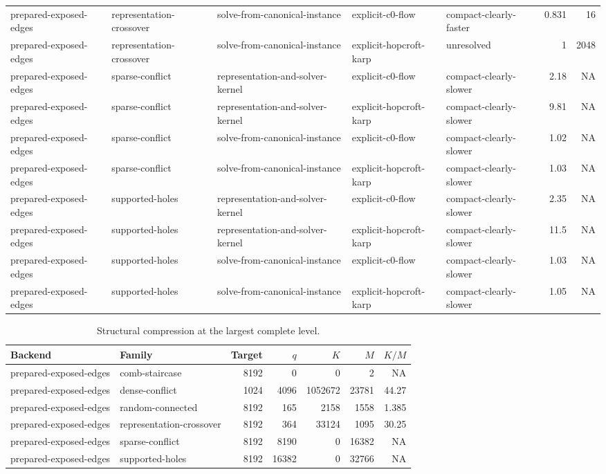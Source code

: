 \begin{table}[t]
\begin{tabular}{lllllrr}
prepared-exposed-edges & representation-crossover & solve-from-canonical-instance & explicit-c0-flow & compact-clearly-faster & 0.831 & 16 \\
prepared-exposed-edges & representation-crossover & solve-from-canonical-instance & explicit-hopcroft-karp & unresolved & 1 & 2048 \\
prepared-exposed-edges & sparse-conflict & representation-and-solver-kernel & explicit-c0-flow & compact-clearly-slower & 2.18 & NA \\
prepared-exposed-edges & sparse-conflict & representation-and-solver-kernel & explicit-hopcroft-karp & compact-clearly-slower & 9.81 & NA \\
prepared-exposed-edges & sparse-conflict & solve-from-canonical-instance & explicit-c0-flow & compact-clearly-slower & 1.02 & NA \\
prepared-exposed-edges & sparse-conflict & solve-from-canonical-instance & explicit-hopcroft-karp & compact-clearly-slower & 1.03 & NA \\
prepared-exposed-edges & supported-holes & representation-and-solver-kernel & explicit-c0-flow & compact-clearly-slower & 2.35 & NA \\
prepared-exposed-edges & supported-holes & representation-and-solver-kernel & explicit-hopcroft-karp & compact-clearly-slower & 11.5 & NA \\
prepared-exposed-edges & supported-holes & solve-from-canonical-instance & explicit-c0-flow & compact-clearly-slower & 1.03 & NA \\
prepared-exposed-edges & supported-holes & solve-from-canonical-instance & explicit-hopcroft-karp & compact-clearly-slower & 1.05 & NA \\
\bottomrule
\end{tabular}
\end{table}

\begin{table}[t]
\caption{Structural compression at the largest complete level.}
\label{tab:kernel-compression}
\begin{tabular}{llrrrrr}
\toprule
Backend & Family & Target & $q$ & $K$ & $M$ & $K/M$ \\
\midrule
prepared-exposed-edges & comb-staircase & 8192 & 0 & 0 & 2 & NA \\
prepared-exposed-edges & dense-conflict & 1024 & 4096 & 1052672 & 23781 & 44.27 \\
prepared-exposed-edges & random-connected & 8192 & 165 & 2158 & 1558 & 1.385 \\
prepared-exposed-edges & representation-crossover & 8192 & 364 & 33124 & 1095 & 30.25 \\
prepared-exposed-edges & sparse-conflict & 8192 & 8190 & 0 & 16382 & NA \\
prepared-exposed-edges & supported-holes & 8192 & 16382 & 0 & 32766 & NA \\
\bottomrule
\end{tabular}
\end{table}

